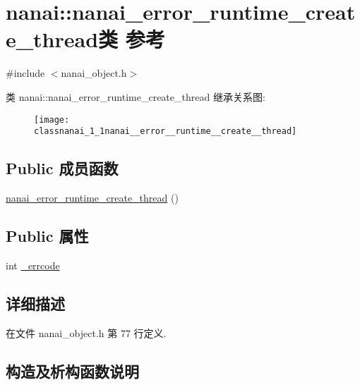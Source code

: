 \hypertarget{classnanai_1_1nanai__error__runtime__create__thread}{}\section{nanai\+:\+:nanai\+\_\+error\+\_\+runtime\+\_\+create\+\_\+thread类 参考}
\label{classnanai_1_1nanai__error__runtime__create__thread}


{\ttfamily \#include $<$nanai\+\_\+object.\+h$>$}

类 nanai\+:\+:nanai\+\_\+error\+\_\+runtime\+\_\+create\+\_\+thread 继承关系图\+:\begin{figure}[H]
\begin{center}
\leavevmode
\texttt{[image: classnanai\_1\_1nanai\_\_error\_\_runtime\_\_create\_\_thread]}
\end{center}
\end{figure}
\subsection*{Public 成员函数}
\begin{DoxyCompactItemize}
\item 
\hyperlink{classnanai_1_1nanai__error__runtime__create__thread_aace42682861730c6af0a207b76b3c329}{nanai\+\_\+error\+\_\+runtime\+\_\+create\+\_\+thread} ()
\end{DoxyCompactItemize}
\subsection*{Public 属性}
\begin{DoxyCompactItemize}
\item 
int \hyperlink{classnanai_1_1nanai__error__runtime__create__thread_abc60a585972bae43ec4d6801097bb5ba}{\+\_\+errcode}
\end{DoxyCompactItemize}


\subsection{详细描述}


在文件 nanai\+\_\+object.\+h 第 77 行定义.



\subsection{构造及析构函数说明}
\hypertarget{classnanai_1_1nanai__error__runtime__create__thread_aace42682861730c6af0a207b76b3c329}{}
